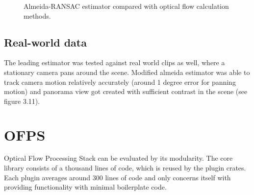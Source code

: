 \documentclass[11pt,english]{report}
\newcommand{\getstat}[1]{docs/statistics/#1}
\newcommand{\vidpic}[1]{
	\texttt{[image: docs/report/\#1]}
}
\newcommand{\statplot}[4]{
	\addplot[#3, mark = #4, thick, smooth, mark size = 2, mark options={fill=#3}] table [y=#2, col sep=comma] {\getstat{#1}};
}
\begin{document}
\begin{figure}[!ht]
\begin{center}
\end{center}
\caption{\centering Almeida-RANSAC estimator compared with optical flow calculation methods.}
\end{figure}

\subsection{Real-world data}

The leading estimator was tested against real world clips as well, where a stationary camera pans around the scene. Modified almeida estimator was able to track camera motion relatively accurately (around 1 degree error for panning motion) and panorama view got created with sufficient contrast in the scene (see figure 3.11).

\newpage

\section{OFPS}

Optical Flow Processing Stack can be evaluated by its modularity. The core library consists of a thousand lines of code, which is reused by the plugin crates. Each plugin averages around 300 lines of code and only concerns itself with providing functionality with minimal boilerplate code.
\end{document}

